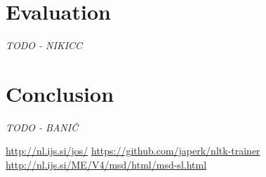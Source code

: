 \documentclass[11pt,a4paper,english,twocolumn]{article}
\begin{document}
\section{Evaluation}\label{Evaluation}
\textit{TODO - NIKICC}
\section{Conclusion}
\textit{TODO - BANIČ}


\begin{thebibliography}{99}
 \url{http://nl.ijs.si/jos/}
 \url{https://github.com/japerk/nltk-trainer}
 \url{http://nl.ijs.si/ME/V4/msd/html/msd-sl.html}
\end{thebibliography}
\end{document}
